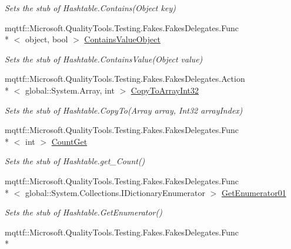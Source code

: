 \begin{DoxyCompactItemize}
\begin{DoxyCompactList}\small\item\em Sets the stub of Hashtable.\-Contains(\-Object key)\end{DoxyCompactList}\item 
mqttf\-::\-Microsoft.\-Quality\-Tools.\-Testing.\-Fakes.\-Fakes\-Delegates.\-Func\\*
$<$ object, bool $>$ \hyperlink{class_system_1_1_configuration_1_1_fakes_1_1_stub_settings_context_a06c74d3c76d01c2b664995064a220819}{Contains\-Value\-Object}
\begin{DoxyCompactList}\small\item\em Sets the stub of Hashtable.\-Contains\-Value(\-Object value)\end{DoxyCompactList}\item 
mqttf\-::\-Microsoft.\-Quality\-Tools.\-Testing.\-Fakes.\-Fakes\-Delegates.\-Action\\*
$<$ global\-::\-System.\-Array, int $>$ \hyperlink{class_system_1_1_configuration_1_1_fakes_1_1_stub_settings_context_ae9ab52fa0a381d54796510720996a60a}{Copy\-To\-Array\-Int32}
\begin{DoxyCompactList}\small\item\em Sets the stub of Hashtable.\-Copy\-To(\-Array array, Int32 array\-Index)\end{DoxyCompactList}\item 
mqttf\-::\-Microsoft.\-Quality\-Tools.\-Testing.\-Fakes.\-Fakes\-Delegates.\-Func\\*
$<$ int $>$ \hyperlink{class_system_1_1_configuration_1_1_fakes_1_1_stub_settings_context_a0a0a7441f0ac058729eeb951f7b7e01a}{Count\-Get}
\begin{DoxyCompactList}\small\item\em Sets the stub of Hashtable.\-get\-\_\-\-Count()\end{DoxyCompactList}\item 
mqttf\-::\-Microsoft.\-Quality\-Tools.\-Testing.\-Fakes.\-Fakes\-Delegates.\-Func\\*
$<$ global\-::\-System.\-Collections.\-I\-Dictionary\-Enumerator $>$ \hyperlink{class_system_1_1_configuration_1_1_fakes_1_1_stub_settings_context_a08b6b4232f08bad2b17c403bb315a64b}{Get\-Enumerator01}
\begin{DoxyCompactList}\small\item\em Sets the stub of Hashtable.\-Get\-Enumerator()\end{DoxyCompactList}\item 
mqttf\-::\-Microsoft.\-Quality\-Tools.\-Testing.\-Fakes.\-Fakes\-Delegates.\-Func\\*

\end{DoxyCompactItemize}
